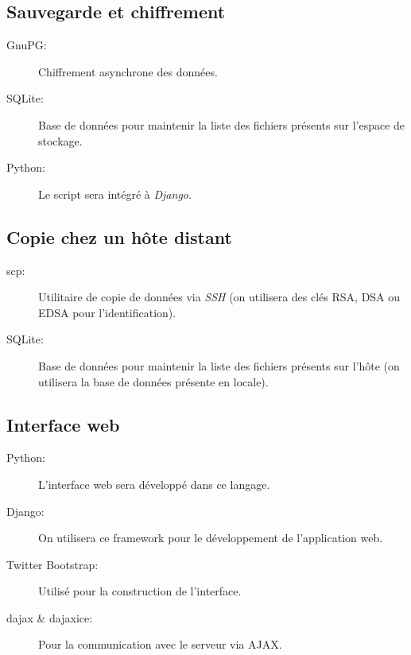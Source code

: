 \subsection{Sauvegarde et chiffrement}

\begin{description}
     \item[GnuPG:] Chiffrement asynchrone des données.
     \item[SQLite:] Base de données pour maintenir la liste des fichiers présents sur l'espace de stockage.
     \item[Python:] Le script sera intégré à \textit{Django}.
\end{description}

\subsection{Copie chez un hôte distant}

\begin{description}
     \item[scp:] Utilitaire de copie de données via \textit{SSH} (on utilisera des clés RSA, DSA ou EDSA pour l'identification).
     \item[SQLite:] Base de données pour maintenir la liste des fichiers présents sur l'hôte (on utilisera la base de données présente en locale).
\end{description}

\subsection{Interface web}

\begin{description}
     \item[Python:] L'interface web sera développé dans ce langage.
     \item[Django:] On utilisera ce framework pour le développement de l'application web.
     \item[Twitter Bootstrap:] Utilisé pour la construction de l'interface.
     \item[dajax \& dajaxice:] Pour la communication avec le serveur via AJAX.
\end{description}

